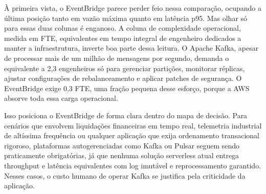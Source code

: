\documentclass[12pt, a4paper]{article}
\begin{document}
\begin{table}[H]
\centering
\caption{Benchmarking Operacional e Parâmetros Físicos Sob Carga de Teste}
\label{tab:desempenho}
\end{table}

À primeira vista, o EventBridge parece perder feio nessa comparação, ocupando a última posição tanto em vazão máxima quanto em latência p95. Mas olhar só para essas duas colunas é enganoso. A coluna de complexidade operacional, medida em FTE, equivalentes em tempo integral de engenheiro dedicados a manter a infraestrutura, inverte boa parte dessa leitura. O Apache Kafka, apesar de processar mais de um milhão de mensagens por segundo, demanda o equivalente a 2,3 engenheiros só para gerenciar partições, monitorar réplicas, ajustar configurações de rebalanceamento e aplicar patches de segurança. O EventBridge exige 0,3 FTE, uma fração pequena desse esforço, porque a AWS absorve toda essa carga operacional.

Isso posiciona o EventBridge de forma clara dentro do mapa de decisão. Para cenários que envolvem liquidações financeiras em tempo real, telemetria industrial de altíssima frequência ou qualquer aplicação que exija ordenamento transacional rigoroso, plataformas autogerenciadas como Kafka ou Pulsar seguem sendo praticamente obrigatórias, já que nenhuma solução serverless atual entrega throughput e latência equivalentes com log imutável e reprocessamento garantido. Nesses casos, o custo humano de operar Kafka se justifica pela criticidade da aplicação.
\end{document}
